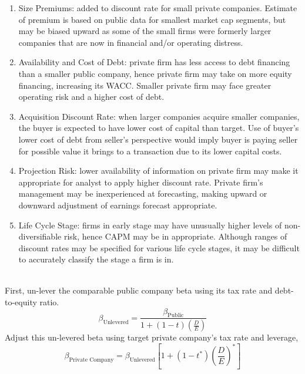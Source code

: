 \begin{remark} 
\begin{enumerate}[label=\roman*.]
\setlength{\itemsep}{0pt}
\item Size Premiums: added to discount rate for small private companies. Estimate of premium is based on public data for smallest market cap segments, but may be biased upward as some of the small firms were formerly larger companies that are now in financial and/or operating distress.
\item Availability and Cost of Debt: private firm has less access to debt financing than a smaller public company, hence private firm may take on more equity financing, increasing its WACC. Smaller private firm may face greater operating risk and a higher cost of debt.
\item Acquisition Discount Rate: when larger companies acquire smaller companies, the buyer is expected to have lower cost of capital than target. Use of buyer's lower cost of debt from seller's perspective would imply buyer is paying seller for possible value it brings to a transaction due to its lower capital costs.
\item Projection Risk: lower availability of information on private firm may make it appropriate for analyst to apply higher discount rate. Private firm's management may be inexperienced at forecasting, making upward or downward adjustment of earnings forecast appropriate.
\item Life Cycle Stage: firms in early stage may have unusually higher levels of non-diversifiable risk, hence CAPM may be in appropriate. Although ranges of discount rates may be specified for various life cycle stages, it may be difficult to accurately classify the stage a firm is in.
\end{enumerate}
\end{remark}

\begin{method} \\
First, un-lever the comparable public company beta using its tax rate and debt-to-equity ratio.
\begin{equation}
\beta_{\text{Unlevered}} = \frac{\beta_{\text{Public}}}{1 + (1-t)(\frac{D}{E})} \nonumber
\end{equation}
Adjust this un-levered beta using target private company's tax rate and leverage,
\begin{equation}
\beta_{\text{Private Company}} = \beta_{\text{Unlevered}}\left[1 + (1-t^*) \left(\frac{D}{E} \right)^* \right] \nonumber
\end{equation}
\end{method}

